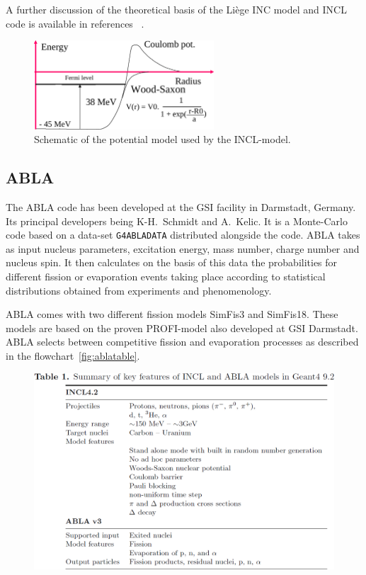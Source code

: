 A further discussion of the theoretical basis of the Liège INC model and INCL code is available in references ~\cite{PhysRevC.66.044615,iia}.

\begin{figure}[ht]
\begin{center}
\includegraphics[width=0.6\textwidth]{images/inclPotential.png}  
\caption{\label{fig:inclpotential} Schematic of the potential model used by the INCL-model.}
 
 \end{center}
 \end{figure}


\subsection{ABLA}

The ABLA code has been developed at the GSI facility in Darmstadt, Germany. Its principal developers being K-H.~Schmidt and A.~Kelic. It is a Monte-Carlo code based on a data-set {\tt G4ABLADATA} distributed alongside the code. ABLA takes as input nucleus parameters, excitation energy, mass number, charge number and nucleus spin. It then calculates on the basis of this data the probabilities for different fission or evaporation events taking place according to statistical distributions obtained from experiments and phenomenology.

ABLA comes with two different fission models SimFis3 and SimFis18. These models are based on the proven PROFI-model also developed at GSI Darmstadt. ABLA selects between competitive fission and evaporation processes as described in the flowchart~\ref{fig:ablatable}.

\begin{figure}[h] 
\begin{center}
\includegraphics[width=1\textwidth]{images/inclSummary.png}  
\caption{\label{fig:inclpotential}}
 
 \end{center}
 \end{figure}

